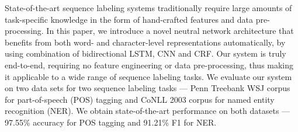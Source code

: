 State-of-the-art sequence labeling systems traditionally require large amounts of task-specific knowledge in the form of hand-crafted features and data pre-processing. In this paper, we introduce a novel neutral network architecture that benefits from both word- and character-level representations automatically, by using combination of bidirectional LSTM, CNN and CRF. Our system is truly end-to-end, requiring no feature engineering or data pre-processing, thus making it applicable to a wide range of sequence labeling tasks. We evaluate our system on two data sets for two sequence labeling tasks --- Penn Treebank WSJ corpus for part-of-speech (POS) tagging and CoNLL 2003 corpus for named entity recognition (NER). We obtain state-of-the-art performance on both datasets --- 97.55\% accuracy for POS tagging and 91.21\% F1 for NER.
